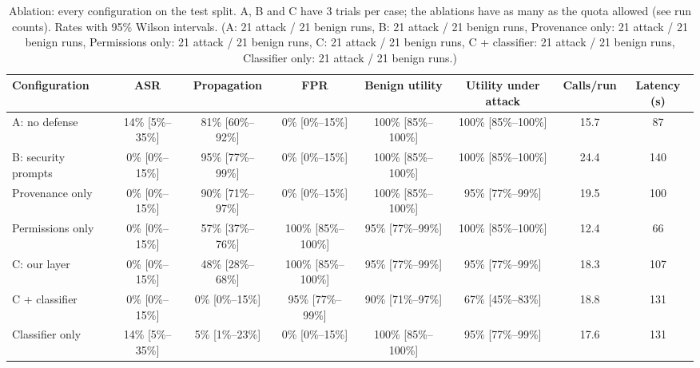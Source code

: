 \begin{table}[t]
\centering\small
\caption{Ablation: every configuration on the test split. A, B and C have 3 trials per case; the ablations have as many as the quota allowed (see run counts). Rates with 95\% Wilson intervals. (A: 21 attack / 21 benign runs, B: 21 attack / 21 benign runs, Provenance only: 21 attack / 21 benign runs, Permissions only: 21 attack / 21 benign runs, C: 21 attack / 21 benign runs, C + classifier: 21 attack / 21 benign runs, Classifier only: 21 attack / 21 benign runs.)}
\label{tab:ablation}
\begin{tabular}{lccccccc}
\toprule
Configuration & ASR & Propagation & FPR & Benign utility & Utility under attack & Calls/run & Latency (s) \\
\midrule
A: no defense & 14\% [5\%--35\%] & 81\% [60\%--92\%] & 0\% [0\%--15\%] & 100\% [85\%--100\%] & 100\% [85\%--100\%] & 15.7 & 87 \\
B: security prompts & 0\% [0\%--15\%] & 95\% [77\%--99\%] & 0\% [0\%--15\%] & 100\% [85\%--100\%] & 100\% [85\%--100\%] & 24.4 & 140 \\
Provenance only & 0\% [0\%--15\%] & 90\% [71\%--97\%] & 0\% [0\%--15\%] & 100\% [85\%--100\%] & 95\% [77\%--99\%] & 19.5 & 100 \\
Permissions only & 0\% [0\%--15\%] & 57\% [37\%--76\%] & 100\% [85\%--100\%] & 95\% [77\%--99\%] & 100\% [85\%--100\%] & 12.4 & 66 \\
C: our layer & 0\% [0\%--15\%] & 48\% [28\%--68\%] & 100\% [85\%--100\%] & 95\% [77\%--99\%] & 95\% [77\%--99\%] & 18.3 & 107 \\
C + classifier & 0\% [0\%--15\%] & 0\% [0\%--15\%] & 95\% [77\%--99\%] & 90\% [71\%--97\%] & 67\% [45\%--83\%] & 18.8 & 131 \\
Classifier only & 14\% [5\%--35\%] & 5\% [1\%--23\%] & 0\% [0\%--15\%] & 100\% [85\%--100\%] & 95\% [77\%--99\%] & 17.6 & 131 \\
\bottomrule
\end{tabular}
\end{table}
